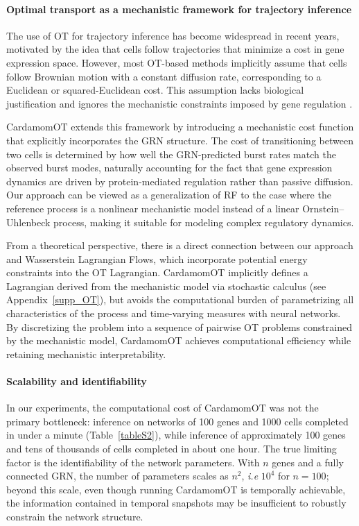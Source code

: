 \documentclass[a4paper, 11pt]{article}
\theoremstyle{plain}
\theoremstyle{remark}
\newcommand*{\firstreview}[1]{{\color{black}#1}}
\begin{document}
\paragraph{Optimal transport as a mechanistic framework for trajectory inference}
The use of \firstreview{OT} for trajectory inference has become widespread in recent years, motivated by the idea that cells follow trajectories that minimize a cost in gene expression space. However, most OT-based methods implicitly assume that cells follow Brownian motion with a constant diffusion rate, corresponding to a Euclidean or squared-Euclidean cost. This assumption lacks biological justification and ignores the mechanistic constraints imposed by gene regulation \cite{fournie2025cell}.

CardamomOT extends this framework by introducing a mechanistic cost function that explicitly incorporates the GRN structure. The cost of transitioning between two cells is determined by how well the GRN-predicted burst rates match the observed burst modes, naturally accounting for the fact that gene expression dynamics are driven by protein-mediated regulation rather than passive diffusion. Our approach can be viewed as a generalization of \firstreview{RF} to the case where the reference process is a nonlinear mechanistic model instead of a linear Ornstein–Uhlenbeck process, making it suitable for modeling complex regulatory dynamics.

From a theoretical perspective, there is a direct connection between our approach and Wasserstein Lagrangian Flows, which incorporate potential energy constraints into the OT Lagrangian. CardamomOT implicitly defines a Lagrangian derived from the mechanistic model via stochastic calculus (see Appendix~\ref{supp_OT}), but avoids the computational burden of parametrizing all characteristics of the process and time-varying measures with neural networks. By discretizing the problem into a sequence of pairwise OT problems constrained by the mechanistic model, CardamomOT achieves computational efficiency while retaining mechanistic interpretability.

\paragraph{Scalability and identifiability}
In our experiments, the computational cost of CardamomOT was not the primary bottleneck: inference on networks \firstreview{of 100 genes and 1000 cells completed in under a minute (Table~\ref{tableS2}), while inference of approximately 100 genes and} tens of thousands of cells completed in about one hour. The true limiting factor is the identifiability of the network parameters. With $n$ genes and a fully connected GRN, the number of parameters scales as $n^2$, \textit{i.e} $10^4$ for $n=100$; beyond this scale, \firstreview{even though running CardamomOT is temporally achievable,} the information contained in temporal snapshots may be insufficient to robustly constrain the network structure.
\end{document}
